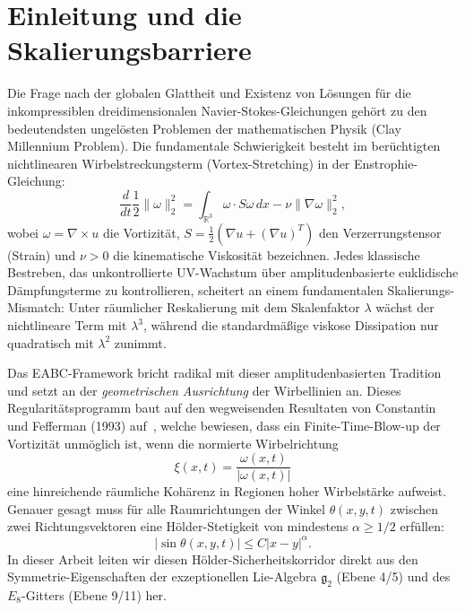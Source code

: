 \documentclass[11pt,twoside,a4paper]{article}
\begin{document}
	\section{Einleitung und die Skalierungsbarriere}
	Die Frage nach der globalen Glattheit und Existenz von Lösungen für die inkompressiblen dreidimensionalen Navier-Stokes-Gleichungen gehört zu den bedeutendsten ungelösten Problemen der mathematischen Physik (Clay Millennium Problem). Die fundamentale Schwierigkeit besteht im berüchtigten nichtlinearen Wirbelstreckungsterm (Vortex-Stretching) in der Enstrophie-Gleichung:
	\begin{equation}
		\frac{d}{dt} \frac{1}{2}\|\omega\|_2^2 = \int_{\mathbb{R}^3} \omega \cdot S \omega \, dx - \nu \|\nabla \omega\|_2^2,
	\end{equation}
	wobei $\omega = \nabla \times u$ die Vortizität, $S = \frac{1}{2}(\nabla u + (\nabla u)^T)$ den Verzerrungstensor (Strain) und $\nu > 0$ die kinematische Viskosität bezeichnen. Jedes klassische Bestreben, das unkontrollierte UV-Wachstum über amplitudenbasierte euklidische Dämpfungsterme zu kontrollieren, scheitert an einem fundamentalen Skalierungs-Mismatch: Unter räumlicher Reskalierung mit dem Skalenfaktor $\lambda$ wächst der nichtlineare Term mit $\lambda^3$, während die standardmäßige viskose Dissipation nur quadratisch mit $\lambda^2$ zunimmt.
	
	Das EABC-Framework bricht radikal mit dieser amplitudenbasierten Tradition und setzt an der \textit{geometrischen Ausrichtung} der Wirbellinien an. Dieses Regularitätsprogramm baut auf den wegweisenden Resultaten von Constantin und Fefferman (1993) auf~\cite{constantin1993}, welche bewiesen, dass ein Finite-Time-Blow-up der Vortizität unmöglich ist, wenn die normierte Wirbelrichtung
	\begin{equation}
		\xi(x,t) = \frac{\omega(x,t)}{|\omega(x,t)|}
	\end{equation}
	eine hinreichende räumliche Kohärenz in Regionen hoher Wirbelstärke aufweist. Genauer gesagt muss für alle Raumrichtungen der Winkel $\theta(x, y, t)$ zwischen zwei Richtungsvektoren eine Hölder-Stetigkeit von mindestens $\alpha \ge 1/2$ erfüllen:
	\begin{equation}
		|\sin \theta(x, y, t)| \le C |x - y|^\alpha.
	\end{equation}
	In dieser Arbeit leiten wir diesen Hölder-Sicherheitskorridor direkt aus den Symmetrie-Eigenschaften der exzeptionellen Lie-Algebra $\mathfrak{g}_2$ (Ebene 4/5) und des $E_8$-Gitters (Ebene 9/11) her.
	
\end{document}
